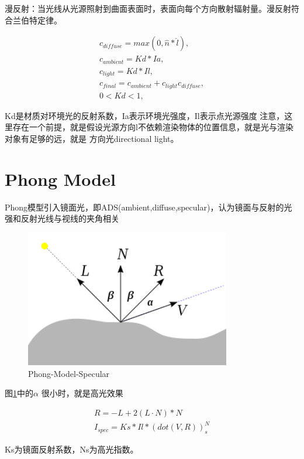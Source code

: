 漫反射：当光线从光源照射到曲面表面时，表面向每个方向散射辐射量。漫反射符合兰伯特定律。

\begin{align*}    
c_{diffuse} = max(0, \hat{n} * \hat{l}), \\
c_{ambient} = Kd * Ia, \\
c_{light} = Kd * Il, \\ 
c_{final} = c_{ambient} + c_{light}c_{diffuse}, \\
0 < Kd < 1, 
\end{align*}

Kd是材质对环境光的反射系数，Ia表示环境光强度，Il表示点光源强度
注意，这里存在一个前提，就是假设光源方向l不依赖渲染物体的位置信息，就是光与渲染对象有足够的远，就是
方向光directional light。

\section{Phong Model}

Phong模型引入镜面光，即ADS(ambient,diffuse,specular)，认为镜面与反射的光强和反射光线与视线的夹角相关

\begin{figure}[htbp]
    \centering
    \includegraphics[width=0.8\textwidth]{images/phong-shading-model.png}
    \caption{Phong-Model-Specular}\label{Phong-Model-Specular}
\end{figure}

图\ref{Phong-Model-Specular}中的$\alpha$ 很小时，就是高光效果

\begin{align*}
    R = -L + 2(L \cdot N) * N \\
    I_{spec}=Ks * Il * (dot(V, R))^N_{s}
\end{align*}

Ks为镜面反射系数，Ns为高光指数。

